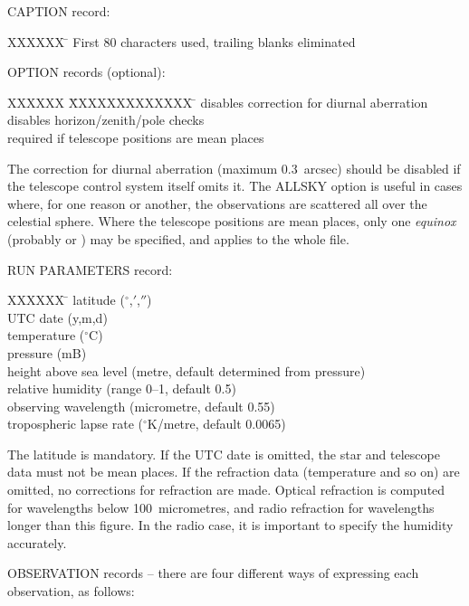 \goodbreak
CAPTION record:
\begin{tabs}
XXXXXX \= \kill
\> First 80 characters used, trailing blanks eliminated
\end{tabs}

\goodbreak
OPTION records (optional):
\begin{tabs}
XXXXXX \= XXXXXXXXXXXXX \= \kill
\>  \> disables correction for diurnal aberration \\
\>  \> disables horizon/zenith/pole checks \\
\>  \>
             required if telescope positions are mean places
\end{tabs}
The correction for diurnal aberration (maximum 0.3~arcsec)
should be disabled if the telescope control system itself
omits it.  The ALLSKY option is useful in cases where, for one
reason or another, the observations are scattered all over the
celestial sphere.
Where the telescope positions are mean places, only one
{\it equinox}\, (probably  or )
may be specified, and applies to the whole file.

\goodbreak
RUN PARAMETERS record:
\begin{tabs}
XXXXXX \= \kill
\> latitude ($^\circ$,$'$,$''$) \\
\> UTC date (y,m,d) \\
\> temperature ($^\circ$C) \\
\> pressure (mB) \\
\> height above sea level (metre, default determined from pressure) \\
\> relative humidity (range 0--1, default 0.5) \\
\> observing wavelength (micrometre, default 0.55) \\
\> tropospheric lapse rate ($^\circ$K/metre, default 0.0065)
\end{tabs}
The latitude is mandatory.  If the UTC date is omitted, the
star and telescope data must not be mean places.  If the
refraction data (temperature and so on) are omitted, no
corrections for refraction are made.
Optical refraction is computed for wavelengths below 100~micrometres,
and radio refraction for wavelengths longer than this figure.
In the radio case, it is important to specify the humidity accurately.

\goodbreak
OBSERVATION records -- there are four different ways of expressing
each observation, as follows:

